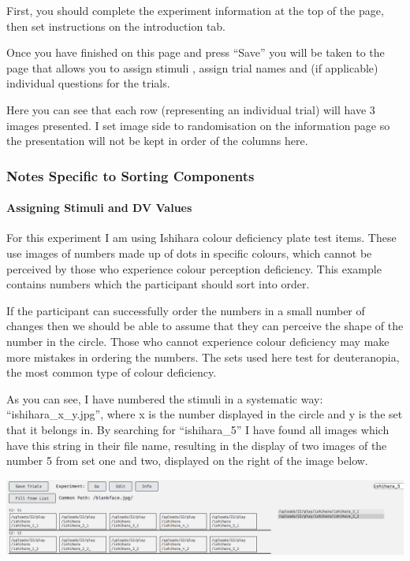 \documentclass[]{book}
\let\oldparagraph\paragraph
\renewcommand{\paragraph}[1]{\oldparagraph{#1}\mbox{}}
\begin{document}
First, you should complete the experiment information at the top of the
page, then set instructions on the introduction tab.

Once you have finished on this page and press ``Save'' you will be taken
to the page that allows you to assign stimuli , assign trial names and
(if applicable) individual questions for the trials.

Here you can see that each row (representing an individual trial) will
have 3 images presented. I set image side to randomisation on the
information page so the presentation will not be kept in order of the
columns here.

\subsubsection*{Notes Specific to Sorting
Components}\label{notes-specific-to-sorting-components}

\paragraph{Assigning Stimuli and DV
Values}\label{assigning-stimuli-and-dv-values}

For this experiment I am using Ishihara colour deficiency plate test
items. These use images of numbers made up of dots in specific colours,
which cannot be perceived by those who experience colour perception
deficiency. This example contains numbers which the participant should
sort into order.

If the participant can successfully order the numbers in a small number
of changes then we should be able to assume that they can perceive the
shape of the number in the circle. Those who cannot experience colour
deficiency may make more mistakes in ordering the numbers. The sets used
here test for deuteranopia, the most common type of colour deficiency.

As you can see, I have numbered the stimuli in a systematic way:
``ishihara\_x\_y.jpg'', where x is the number displayed in the circle
and y is the set that it belongs in. By searching for ``ishihara\_5'' I
have found all images which have this string in their file name,
resulting in the display of two images of the number 5 from set one and
two, displayed on the right of the image below.

\includegraphics{images/screenshots/stim_sorting.png}
\end{document}
